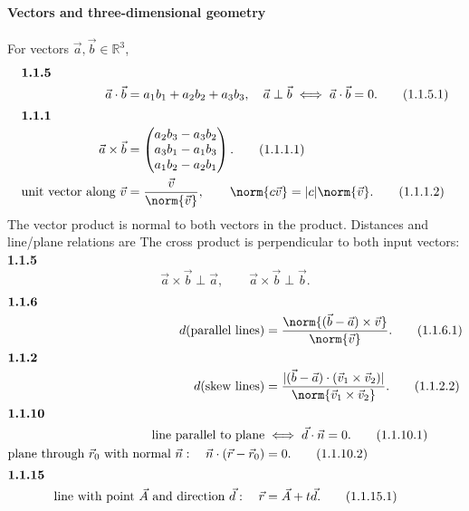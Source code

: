 \paragraph*{Vectors and three-dimensional geometry}
For vectors $\vec a,\vec b\in\mathbb R^3$,
\begin{align}\intertext{\textbf{1.1.5}}
\vec a\cdot\vec b&=a_1b_1+a_2b_2+a_3b_3,\quad \vec a\perp\vec b\iff \vec a\cdot\vec b=0. \tag{1.1.5.1}\\
\intertext{\textbf{1.1.1}}
\vec a\times\vec b&=\begin{pmatrix}a_2b_3-a_3b_2\\a_3b_1-a_1b_3\\a_1b_2-a_2b_1\end{pmatrix}. \tag{1.1.1.1}\\
\text{unit vector along }\vec v&=\frac{\vec v}{\norm{\vec v}},\qquad \norm{c\vec v}=|c|\norm{\vec v}. \tag{1.1.1.2}
\end{align}
The vector product is normal to both vectors in the product. Distances and line/plane relations are
The cross product is perpendicular to both input vectors:
\noindent\textbf{1.1.5}\quad
\begin{equation}
\vec a\times\vec b\perp\vec a,\qquad \vec a\times\vec b\perp\vec b.\tag{1.1.5.2}\label{eq:cross-perpendicular}
\end{equation}
\begin{align}\intertext{\textbf{1.1.6}}
d(\text{parallel lines})&=\frac{\norm{(\vec b-\vec a)\times\vec v}}{\norm{\vec v}}. \tag{1.1.6.1}\\
\intertext{\textbf{1.1.2}}
d(\text{skew lines})&=\frac{|(\vec b-\vec a)\cdot(\vec v_1\times\vec v_2)|}{\norm{\vec v_1\times\vec v_2}}. \tag{1.1.2.2}\\
\intertext{\textbf{1.1.10}}
\text{line parallel to plane}&\iff \vec d\cdot\vec n=0. \tag{1.1.10.1}\\
\text{plane through }\vec r_0\text{ with normal }\vec n:\quad \vec n\cdot(\vec r-\vec r_0)&=0. \tag{1.1.10.2}\\
\intertext{\textbf{1.1.15}}
\text{line with point }\vec A\text{ and direction }\vec d:\quad \vec r&=\vec A+t\vec d. \tag{1.1.15.1}
\end{align}

